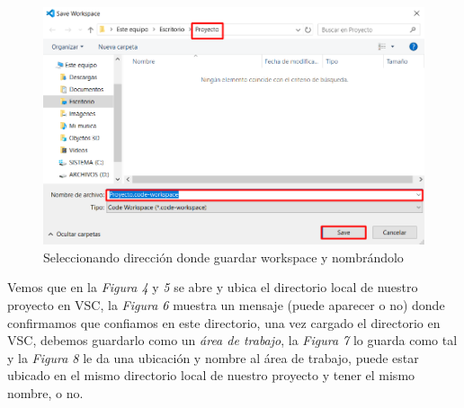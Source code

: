 \begin{figure}[H]
    \begin{center}
        \caption{Seleccionando dirección donde guardar workspace y nombrándolo}
        \label{fig: 8}
        \includegraphics[width=12cm]{capturas/creando_w5.png}
    \end{center}
\end{figure}

Vemos que en la \textit{Figura 4} y \textit{5} se abre y ubica el directorio local de nuestro proyecto en VSC, la \textit{Figura 6} muestra un mensaje (puede aparecer o no) donde confirmamos que confiamos en este directorio, una vez cargado el directorio en VSC, debemos guardarlo como un \textit{área de trabajo}, la \textit{Figura 7} lo guarda como tal y la \textit{Figura 8} le da una ubicación y nombre al área de trabajo, puede estar ubicado en el mismo directorio local de nuestro proyecto y tener el mismo nombre, o no.

